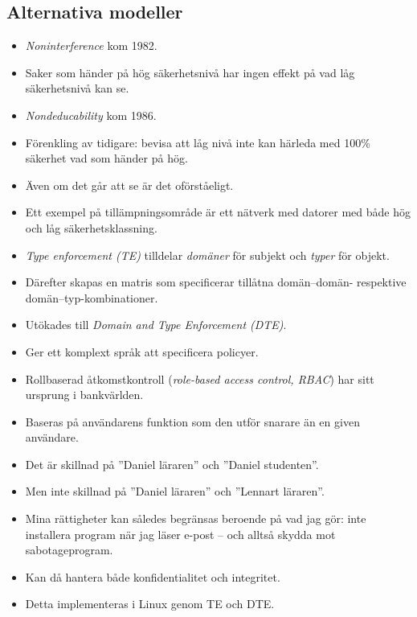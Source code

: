 \documentclass{beamer}
\begin{document}
\subsection{Alternativa modeller}
\begin{frame}{\insertsubsectionhead}
  \begin{itemize}
    \item \emph{Noninterference} kom 1982.
    \item Saker som händer på hög säkerhetsnivå har ingen effekt på vad låg 
      säkerhetsnivå kan se.
    \item \emph{Nondeducability} kom 1986.
    \item Förenkling av tidigare: bevisa att låg nivå inte kan härleda med 
      \unit{100}{\%} säkerhet vad som händer på hög.
    \item Även om det går att se är det oförståeligt.
    \item Ett exempel på tillämpningsområde är ett nätverk med datorer med både 
      hög och låg säkerhetsklassning.
  \end{itemize}
\end{frame}
\begin{frame}{\insertsubsectionhead}
  \begin{itemize}
    \item \emph{Type enforcement (TE)} tilldelar \emph{domäner} för subjekt och 
      \emph{typer} för objekt.
    \item Därefter skapas en matris som specificerar tillåtna domän--domän- 
      respektive domän--typ-kombinationer.
    \item Utökades till \emph{Domain and Type Enforcement (DTE)}.
    \item Ger ett komplext språk att specificera policyer.
  \end{itemize}
\end{frame}
\begin{frame}{\insertsubsectionhead}
  \begin{itemize}
    \item Rollbaserad åtkomstkontroll (\emph{role-based access control, RBAC}) 
      har sitt ursprung i bankvärlden.
    \item Baseras på användarens funktion som den utför snarare än en given 
      användare.
    \item Det är skillnad på ''Daniel läraren'' och ''Daniel studenten''.
    \item Men inte skillnad på ''Daniel läraren'' och ''Lennart läraren''.
    \item Mina rättigheter kan således begränsas beroende på vad jag gör: inte 
      installera program när jag läser e-post -- och alltså skydda mot 
      sabotageprogram.
    \item Kan då hantera både konfidentialitet och integritet.
    \item Detta implementeras i Linux genom TE och DTE.
  \end{itemize}
\end{frame}
\end{document}
